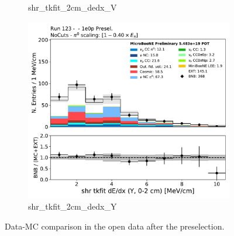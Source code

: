 \begin{figure}[H]
\begin{center}
\begin{subfigure}[b]{0.3\textwidth}
    \caption{\label{fig:1e0p:dataMCRun1:shr_tkfit_dedx_V} shr\_tkfit\_2cm\_dedx\_V }
    \end{subfigure}
    \begin{subfigure}[b]{0.3\textwidth}
    \centering
    \includegraphics[width=1.00\textwidth]{1e0p/dataMCRun123/shr_tkfit_2cm_dedx_Y.pdf}
    \caption{\label{fig:1e0p:dataMCRun1:shr_tkfit_2cm_dedx_Y} shr\_tkfit\_2cm\_dedx\_Y }
    \end{subfigure}
\caption{\label{fig:1e0p:dataMCRun1:shr_tkfit_dedx_2cm}Data-MC comparison in the open data after the \zpsel preselection.}
\end{center}
\end{figure}

